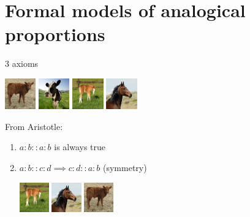 \documentclass{beamer}
\begin{document}
\section[Analogical proportions]{Formal models of analogical proportions}

\begin{frame}{3 axioms}
  \begin{center}
  \includegraphics[width=0.1\textwidth]{figures/calf.jpg}
  \includegraphics[width=0.1\textwidth]{figures/cow.jpg}
  \includegraphics[width=0.1\textwidth]{figures/foal.jpg}
  \includegraphics[width=0.1\textwidth]{figures/horse.jpg}
  \end{center}
  From Aristotle:
  \begin{enumerate}
    \item $a:b::a:b$ is always true
    \item $a:b::c:d \implies c:d::a:b$ (symmetry)
    \begin{center}
      \includegraphics[width=0.1\textwidth]{figures/foal.jpg}
      \includegraphics[width=0.1\textwidth]{figures/horse.jpg}
      \includegraphics[width=0.1\textwidth]{figures/calf.jpg}

\end{center}
\end{enumerate}
\end{frame}
\end{document}
